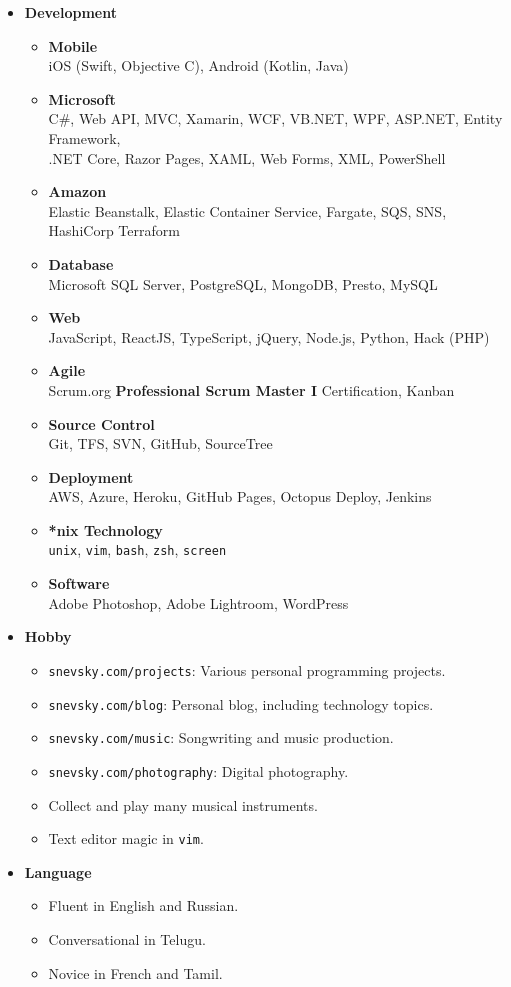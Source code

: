 \documentclass[letterpaper,11pt]{article}
\newcommand{\resitem}[1]{\item #1 \vspace{0pt}}
\begin{document}
\begin{itemize}

    \item {\bf Development}

        \begin{itemize}
            \resitem{\textbf{Mobile} \\ iOS (Swift, Objective C), Android (Kotlin, Java)}
            \resitem{\textbf{Microsoft} \\ C\#, Web API, MVC, Xamarin, WCF, VB.NET, WPF, ASP.NET, 
            Entity Framework, \\ .NET Core, Razor Pages, XAML, Web Forms, XML, PowerShell}
            \resitem{\textbf{Amazon} \\ Elastic Beanstalk, Elastic Container Service, Fargate, SQS, SNS, HashiCorp Terraform}
            \resitem{\textbf{Database} \\ Microsoft SQL Server, PostgreSQL, MongoDB, Presto, MySQL}
            \resitem{\textbf{Web} \\ JavaScript, ReactJS, TypeScript, jQuery, Node.js, Python, Hack (PHP)}
            \resitem{\textbf{Agile} \\ Scrum.org \textbf{Professional Scrum Master I} Certification, Kanban}
            \resitem{\textbf{Source Control} \\ Git, TFS, SVN, GitHub, SourceTree}
            \resitem{\textbf{Deployment} \\ AWS, Azure, Heroku, GitHub Pages, Octopus Deploy, Jenkins}
            \resitem{\textbf{*nix Technology} \\ \texttt{unix}, \texttt{vim}, \texttt{bash}, \texttt{zsh}, \texttt{screen}}
            \resitem{\textbf{Software} \\ Adobe Photoshop, Adobe Lightroom, WordPress}
        \end{itemize}

    \item {\bf Hobby}

      \begin{itemize}
          \resitem{\texttt{snevsky.com/projects}: Various personal programming projects.}
          \resitem{\texttt{snevsky.com/blog}: Personal blog, including technology topics.}
          \resitem{\texttt{snevsky.com/music}: Songwriting and music production.}
          \resitem{\texttt{snevsky.com/photography}: Digital photography.}
          \resitem{Collect and play many musical instruments.}
          \resitem{Text editor magic in \texttt{vim}.}
      \end{itemize}

    \item {\bf Language}

    \begin{itemize}
        \resitem{Fluent in English and Russian.}
        \resitem{Conversational in Telugu.}
        \resitem{Novice in French and Tamil.}
    \end{itemize}



\end{itemize}
\end{document}
